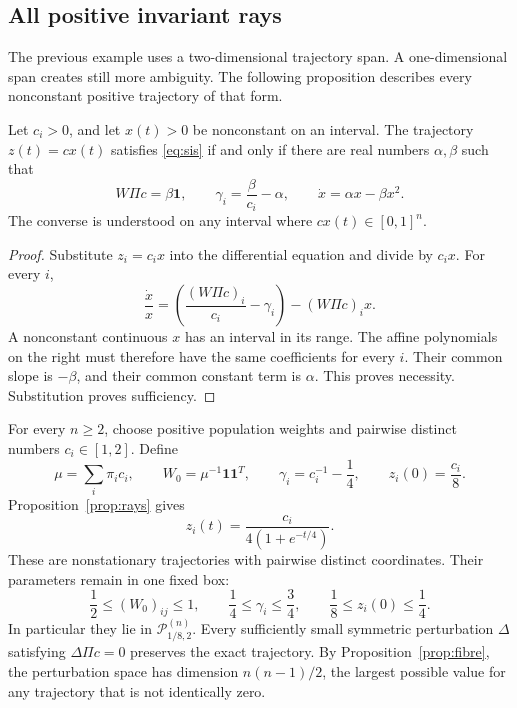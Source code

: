 \subsection{All positive invariant rays}

The previous example uses a two-dimensional trajectory span. A one-dimensional span creates still more ambiguity. The following proposition describes every nonconstant positive trajectory of that form.

\begin{proposition}
\label{prop:rays}
Let $c_i>0$, and let $x(t)>0$ be nonconstant on an interval. The trajectory $z(t)=cx(t)$ satisfies \eqref{eq:sis} if and only if there are real numbers $\alpha,\beta$ such that
\begin{equation}
 W\Pi c=\beta\mathbf1,\qquad
 \gamma_i=\frac\beta{c_i}-\alpha,
 \qquad \dot x=\alpha x-\beta x^2.
 \label{eq:ray-classification}
\end{equation}
The converse is understood on any interval where $cx(t)\in[0,1]^n$.
\end{proposition}

\begin{proof}
Substitute $z_i=c_ix$ into the differential equation and divide by $c_ix$. For every $i$,
\[
 \frac{\dot x}{x}
 =\left(\frac{(W\Pi c)_i}{c_i}-\gamma_i\right)
  -(W\Pi c)_ix.
\]
A nonconstant continuous $x$ has an interval in its range. The affine polynomials on the right must therefore have the same coefficients for every $i$. Their common slope is $-\beta$, and their common constant term is $\alpha$. This proves necessity. Substitution proves sufficiency.
\end{proof}

For every $n\geq2$, choose positive population weights and pairwise distinct numbers $c_i\in[1,2]$. Define
\begin{equation}
 \mu=\sum_i\pi_i c_i,
 \qquad W_0=\mu^{-1}\mathbf1\mathbf1^T,
 \qquad\gamma_i=c_i^{-1}-\frac14,
 \qquad z_i(0)=\frac{c_i}{8}.
 \label{eq:ray-family}
\end{equation}
Proposition~\ref{prop:rays} gives
\begin{equation}
 z_i(t)=\frac{c_i}{4(1+e^{-t/4})}.
 \label{eq:ray-solution}
\end{equation}
These are nonstationary trajectories with pairwise distinct coordinates. Their parameters remain in one fixed box:
\[
 \frac12\leq(W_0)_{ij}\leq1,
 \qquad\frac14\leq\gamma_i\leq\frac34,
 \qquad\frac18\leq z_i(0)\leq\frac14.
\]
In particular they lie in $\mathcal P_{1/8,2}^{(n)}$. Every sufficiently small symmetric perturbation $\Delta$ satisfying $\Delta\Pi c=0$ preserves the exact trajectory. By Proposition~\ref{prop:fibre}, the perturbation space has dimension $n(n-1)/2$, the largest possible value for any trajectory that is not identically zero.

